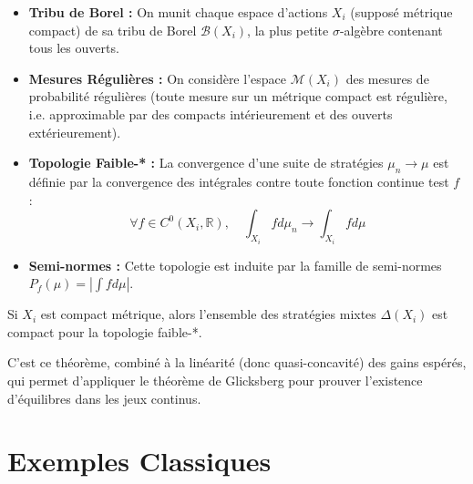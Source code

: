 \begin{itemize}
    \item \textbf{Tribu de Borel :} On munit chaque espace d'actions $X_i$ (supposé métrique compact) de sa tribu de Borel $\mathcal{B}(X_i)$, la plus petite $\sigma$-algèbre contenant tous les ouverts.
    \item \textbf{Mesures Régulières :} On considère l'espace $\mathcal{M}(X_i)$ des mesures de probabilité régulières (toute mesure sur un métrique compact est régulière, i.e. approximable par des compacts intérieurement et des ouverts extérieurement).
    \item \textbf{Topologie Faible-* :} La convergence d'une suite de stratégies $\mu_n \to \mu$ est définie par la convergence des intégrales contre toute fonction continue test $f$ :
    $$\forall f \in C^0(X_i, \mathbb{R}), \quad \int_{X_i} f d\mu_n \to \int_{X_i} f d\mu$$
    \item \textbf{Semi-normes :} Cette topologie est induite par la famille de semi-normes $P_f(\mu) = |\int f d\mu|$.
\end{itemize}

\begin{theoreme}
Si $X_i$ est compact métrique, alors l'ensemble des stratégies mixtes $\Delta(X_i)$ est compact pour la topologie faible-*.
\end{theoreme}
C'est ce théorème, combiné à la linéarité (donc quasi-concavité) des gains espérés, qui permet d'appliquer le théorème de Glicksberg pour prouver l'existence d'équilibres dans les jeux continus.

\section{Exemples Classiques}

